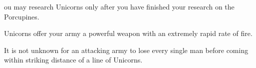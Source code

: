 ou may research Unicorns only after you have finished your research on the Porcupines.

Unicorns offer your army a powerful weapon with an extremely rapid rate of fire.

It is not unknown for an attacking army to lose every single man before coming within striking distance of a line of Unicorns.